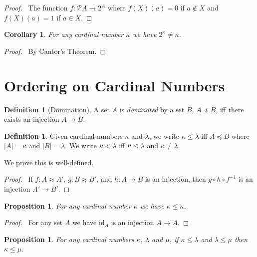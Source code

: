 \documentclass{book}
\let\qed\relax
\newtheorem{prop}[ax]{Proposition}
\newtheorem{cor}{Corollary}[ax]
\theoremstyle{definition}
\newtheorem{df}[ax]{Definition}
\begin{document}
\begin{proof}
\pf\ The function $f : \mathcal{P} A \rightarrow 2^A$ where $f(X)(a) = 0$ if $a \notin X$ and $f(X)(a) = 1$ if $a \in X$. \qed
\end{proof}

\begin{cor}
For any cardinal number $\kappa$ we have $2^\kappa \neq \kappa$.
\end{cor}

\begin{proof}
\pf\ By Cantor's Theorem. \qed
\end{proof}

\section{Ordering on Cardinal Numbers}

\begin{df}[Domination]
A set $A$ is \emph{dominated} by a set $B$, $A \preccurlyeq B$, iff there exists an injection $A \rightarrow B$.
\end{df}

\begin{df}
Given cardinal numbers $\kappa$ and $\lambda$, we write $\kappa \leq \lambda$ iff $A \preccurlyeq B$ where $|A| = \kappa$ and $|B| = \lambda$. We write $\kappa < \lambda$ iff $\kappa \leq \lambda$ and $\kappa \neq \lambda$.

We prove this is well-defined.
\end{df}

\begin{proof}
\pf\ If $f : A \approx A'$, $g : B \approx B'$, and $h : A \rightarrow B$ is an injection, then $g \circ h \circ f^{-1}$ is an injection $A' \rightarrow B'$. \qed
\end{proof}

\begin{prop}
For any cardinal number $\kappa$ we have $\kappa \leq \kappa$.
\end{prop}

\begin{proof}
\pf\ For any set $A$ we have $\mathrm{id}_A$ is an injection $A \rightarrow A$. \qed
\end{proof}

\begin{prop}
For any cardinal numbers $\kappa$, $\lambda$ and $\mu$, if $\kappa \leq \lambda$ and $\lambda \leq \mu$ then $\kappa \leq \mu$.
\end{prop}
\end{document}
